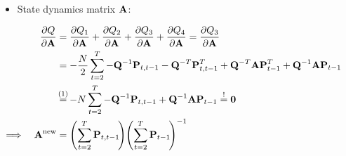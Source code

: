 		\begin{itemize}
			\item State dynamics matrix \(\boldsymbol{\mathrm{A}}\):
		\end{itemize}
		\begin{align}
			&&\pdv{Q}{\mat{A}}
				&= \pdv{Q_1}{\mat{A}} + \pdv{Q_2}{\mat{A}} + \pdv{Q_3}{\mat{A}} + \pdv{Q_4}{\mat{A}} = \pdv{Q_3}{\mat{A}} & \nonumber \\
			&&	&= -\frac{N}{2} \sum_{t = 2}^{T} -\mat{Q}^{-1} \mat{P}_{t, t - 1} - \mat{Q}^{-T} \mat{P}_{t, t - 1}^T + \mat{Q}^{-T} \mat{A} \mat{P}_{t - 1}^T + \mat{Q}^{-1} \mat{A} \mat{P}_{t - 1} & \nonumber \\
			&&	&\oversetfootnotemark{=} -N \sum_{t = 2}^{T} -\mat{Q}^{-1} \mat{P}_{t, t - 1} + \mat{Q}^{-1} \mat{A} \mat{P}_{t - 1} \overset{!}{=} \mat{0} & \nonumber \\
			\implies && \mat{A}^\new &= \Bigg(\! \sum_{t = 2}^{T} \mat{P}_{t, t - 1} \!\Bigg) \Bigg(\! \sum_{t = 2}^{T} \mat{P}_{t - 1} \!\Bigg)^{-1} & \label{eq:stateDynamicsMatrix}
		\end{align}

